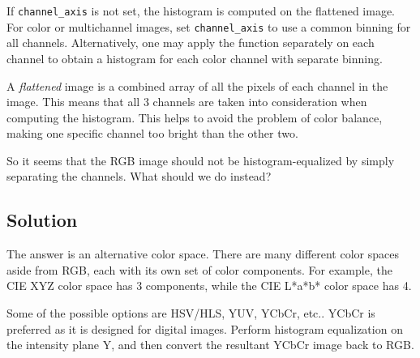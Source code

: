 \documentclass[11pt]{article}
\begin{document}
If \texttt{channel\_axis} is not set, the histogram is computed on the
flattened image. For color or multichannel images, set
\texttt{channel\_axis} to use a common binning for all channels.
Alternatively, one may apply the function separately on each channel to
obtain a histogram for each color channel with separate binning.

A \emph{flattened} image is a combined array of all the pixels of each
channel in the image. This means that all 3 channels are taken into
consideration when computing the histogram. This helps to avoid the
problem of color balance, making one specific channel too bright than
the other two.

So it seems that the RGB image should not be histogram-equalized by
simply separating the channels. What should we do instead?

    \hypertarget{solution}{%
\subsection{Solution}\label{solution}}

The answer is an alternative color space. There are many different color
spaces aside from RGB, each with its own set of color components. For
example, the CIE XYZ color space has 3 components, while the CIE L*a*b*
color space has 4.

Some of the possible options are HSV/HLS, YUV, YCbCr, etc.. YCbCr is
preferred as it is designed for digital images. Perform histogram
equalization on the intensity plane Y, and then convert the resultant
YCbCr image back to RGB.
\end{document}
